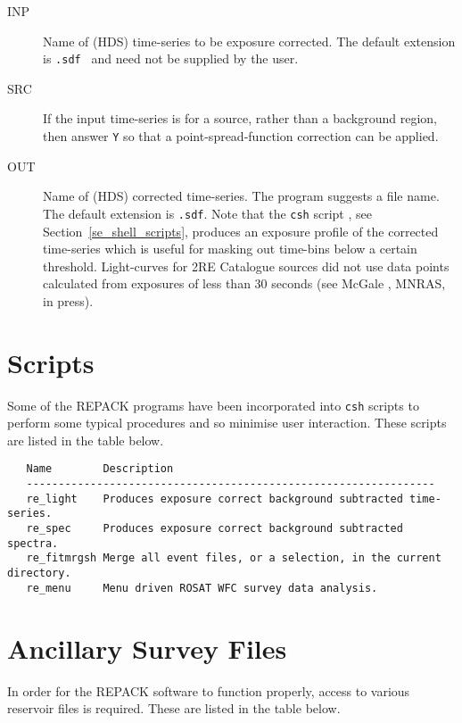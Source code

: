 \begin{description}
\item[INP   ]
Name of (HDS) time-series to be exposure corrected. The default extension is
{\tt .sdf } and need not be supplied by the user.
\item[SRC   ]
If the input time-series is for a source, rather than a background
region, then answer {\tt Y} so that a point-spread-function correction
can be applied.
\item[OUT   ]
Name of (HDS) corrected time-series. The program suggests a file name.
The default extension is {\tt .sdf}. Note that the {\tt csh} script
, see
Section~\ref{se_shell_scripts}, produces an exposure profile of the
corrected time-series which is useful for masking out time-bins below a
certain threshold.  Light-curves for 2RE Catalogue sources did not use
data points calculated from exposures of less than 30 seconds (see
McGale \etal, MNRAS, in press).
\end{description}

\section{\label{se_shell_scripts} Scripts}

Some of the REPACK programs have been incorporated into {\tt csh}
scripts to perform some typical procedures and so minimise user interaction.
These scripts are listed in the table below.

\begin{verbatim}
   Name        Description
   ----------------------------------------------------------------
   re_light    Produces exposure correct background subtracted time-series.
   re_spec     Produces exposure correct background subtracted spectra.
   re_fitmrgsh Merge all event files, or a selection, in the current directory.
   re_menu     Menu driven ROSAT WFC survey data analysis.
\end{verbatim}

\section{\label{se_ancilliary_files}Ancillary Survey Files}

In order for the REPACK software to function properly,  access to various
reservoir files is required.  These are listed in the table below.

